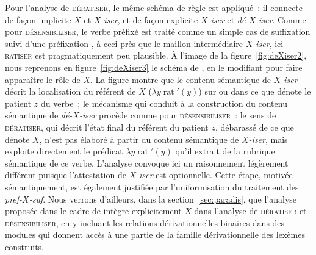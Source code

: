 \documentclass[output=paper]{langsci/langscibook}
\begin{document}
\newpage 
Pour l'analyse de \textsc{dératiser}, le même schéma de règle est appliqué~: il connecte de façon implicite $X$ et \emph{\mbox{$X$-iser}}, et de façon explicite \emph{\mbox{$X$-iser}} et \emph{\mbox{dé-$X$-iser}}.  Comme pour \textsc{désensibiliser}, le verbe préfixé est traité comme un simple cas de suffixation suivi d'une préfixation \citep[298]{Fradin03}, à ceci près que le maillon intermédiaire \emph{\mbox{$X$-iser}}, ici \textsc{ratiser} est pragmatiquement peu plausible.  À l'image de la figure~\ref{fig:deXiser2}, nous reprenons en figure~\ref{fig:deXiser3} le schéma de  \citep[297]{Fradin03}, en le modifiant pour faire apparaître le rôle de $X$.  La figure montre que le contenu sémantique de \emph{\mbox{$X$-iser}} décrit la localisation du référent de $X$ ($\lambda y \operatorname{rat}'(y)$) sur ou dans ce que dénote le patient $z$ du verbe~; le mécanisme qui conduit à la construction du contenu sémantique de \emph{\mbox{dé-$X$-iser}} procède comme pour \textsc{désensibiliser}~: le sens de \textsc{dératiser}, qui décrit l'état final du référent du patient $z$, débarassé de ce que dénote $X$, n'est pas élaboré à partir du contenu sémantique de \emph{\mbox{$X$-iser}}, mais exploite directement le prédicat $\lambda y \operatorname{rat}'(y)$ qu'il extrait de la rubrique sémantique de ce verbe. L'analyse convoque ici un raisonnement légèrement différent puisque l'attestation de \emph{\mbox{$X$-iser}} est optionnelle. Cette étape, motivée sémantiquement, est également justifiée par l'uniformisation du traitement des \emph{\mbox{pref-$X$-suf}}.
Nous verrons d'ailleurs, dans la section~\ref{sec:paradis},  que l'analyse proposée dans le cadre de \paradis{} intègre explicitement $X$ dans l'analyse de  \textsc{dératiser} et \textsc{désensibiliser}, en y incluant les relations dérivationnelles binaires dans des modules qui donnent accès à une partie de la famille dérivationnelle des lexèmes construits.
\end{document}
